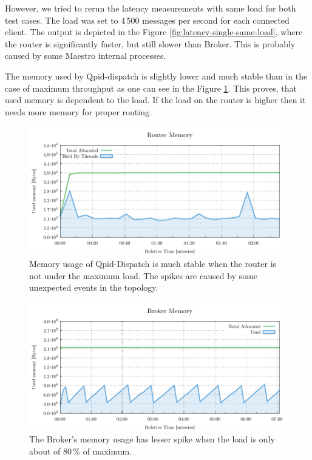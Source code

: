 However, we tried to rerun the latency measurements with same load for both test cases. The load was set to 4\,500 messages per second for each connected client. The output is depicted in the Figure \ref{fig:latency-single-same-load}, where the router is significantly faster, but still slower than Broker. This is probably caused by some Maestro internal processes.

The memory used by Qpid-dispatch is slightly lower and much stable than in the case of maximum throughput as one can see in the Figure \ref{fig:latency-single-router-memory}. This proves, that used memory is dependent to the load. If the load on the router is higher then it needs more memory for proper routing.

\begin{figure}[H]
	\centering
	\includegraphics[width=1\linewidth]{obrazky-figures/charts/singlepoint-router-latency-memory.pdf}
	\caption{Memory usage of Qpid-Dispatch is much stable when the router is not under the maximum load. The spikes are caused by some unexpected events in the topology.}
	\label{fig:latency-single-router-memory}
\end{figure}


\begin{figure}[H]
	\centering
	\includegraphics[width=1\linewidth]{obrazky-figures/charts/singlepoint-broker-latency-memory.pdf}
	\caption{The Broker's memory usage has lesser spike when the load is only about of 80\,\% of maximum.}
	\label{fig:latency-single-broker-memory}
\end{figure}

